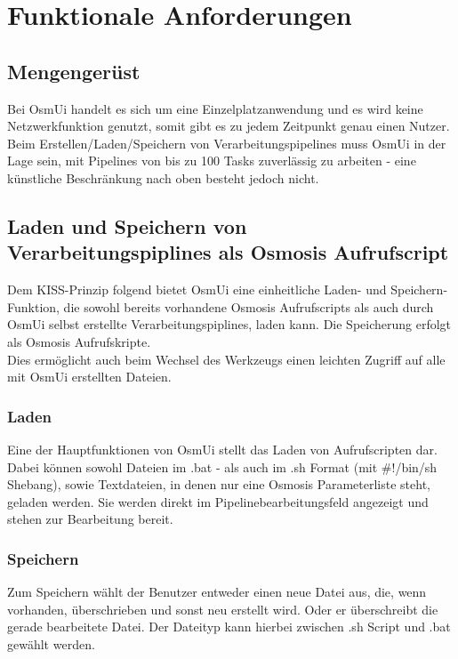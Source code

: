 \documentclass[a4paper,10pt]{scrartcl}
\begin{document}
\section{Funktionale Anforderungen}
\subsection{Mengengerüst}
Bei OsmUi handelt es sich um eine Einzelplatzanwendung und es wird keine Netzwerkfunktion genutzt, somit gibt es zu jedem Zeitpunkt genau einen Nutzer.\\
Beim Erstellen/Laden/Speichern von Verarbeitungspipelines muss OsmUi in der Lage sein, mit Pipelines von bis zu 100 Tasks zuverlässig zu arbeiten -
eine künstliche Beschränkung nach oben besteht jedoch nicht.
\subsection{Laden und Speichern von Verarbeitungspiplines als Osmosis Aufrufscript}
Dem KISS-Prinzip folgend bietet OsmUi eine einheitliche Laden- und Speichern-Funktion, die sowohl bereits vorhandene Osmosis Aufrufscripts als auch durch OsmUi
selbst erstellte Verarbeitungspiplines, laden kann. Die Speicherung erfolgt als Osmosis Aufrufskripte.\\
Dies ermöglicht auch beim Wechsel des Werkzeugs einen leichten Zugriff auf alle mit OsmUi erstellten Dateien.
\subsubsection{Laden}
Eine der Hauptfunktionen von OsmUi stellt das Laden von Aufrufscripten dar. Dabei können sowohl Dateien im .bat - als auch im .sh Format (mit \#!/bin/sh Shebang),
sowie Textdateien, in denen nur eine Osmosis Parameterliste steht, geladen werden. Sie werden direkt im Pipelinebearbeitungsfeld angezeigt und
stehen zur Bearbeitung bereit.
\subsubsection{Speichern}
Zum Speichern wählt der Benutzer entweder einen neue Datei aus, die, wenn vorhanden, überschrieben und sonst neu erstellt wird. Oder er überschreibt die gerade bearbeitete Datei.
Der Dateityp kann hierbei zwischen .sh Script und .bat gewählt werden.
\end{document}
